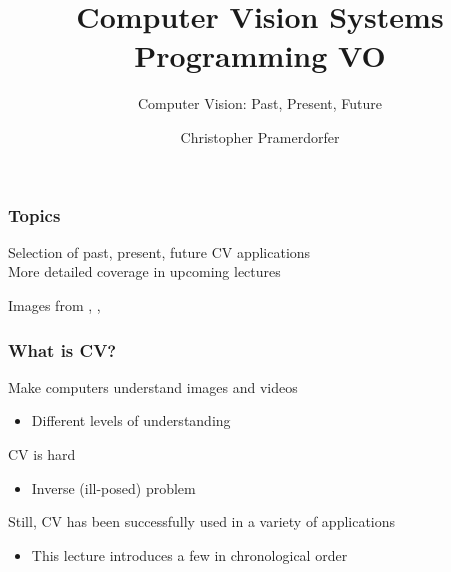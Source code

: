 \documentclass[xetex,professionalfont]{beamer}
\title{Computer Vision Systems Programming VO}
\subtitle{Computer Vision: Past, Present, Future}
\author{Christopher Pramerdorfer}
\institute{Computer Vision Lab, Vienna University of Technology}
\begin{document}

\begin{frame}
\maketitle
\end{frame}


\begin{frame}
\frametitle{Topics}

Selection of past, present, future CV applications\\\medskip
More detailed coverage in upcoming lectures

\bigskip
\begin{center}
	{\centering Images from \cite{lecun1989}, \cite{shotton2011}, \cite{taigman2013}}
\end{center}

\end{frame}


\begin{frame}
\frametitle{What is CV?}

Make computers understand images and videos
\begin{itemize}
	\item Different levels of understanding %
\end{itemize}

\bigskip
CV is hard
\begin{itemize}
	\item Inverse (ill-posed) problem %
\end{itemize}

\bigskip
Still, CV has been successfully used in a variety of applications
\begin{itemize}
	\item This lecture introduces a few in chronological order
\end{itemize}

\end{frame}
\end{document}
